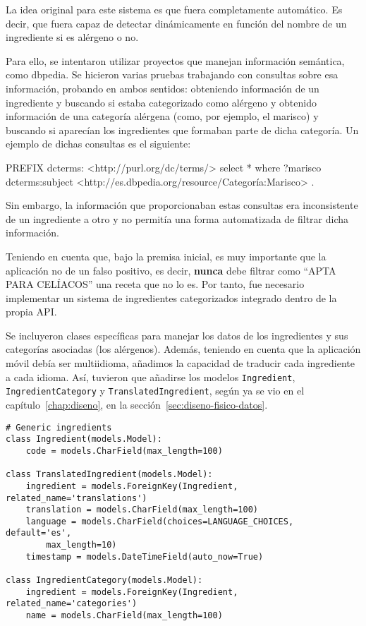 La idea original para este sistema es que fuera completamente automático. Es
decir, que fuera capaz de detectar dinámicamente en función del nombre de un
ingrediente si es alérgeno o no.

Para ello, se intentaron utilizar proyectos que manejan información semántica,
como dbpedia. Se hicieron varias pruebas trabajando con consultas sobre esa
información, probando en ambos sentidos: obteniendo información de un ingrediente
y buscando si estaba categorizado como alérgeno y  obtenido información de una
categoría alérgena (como, por ejemplo, el marisco) y buscando si aparecían
los ingredientes que formaban parte de dicha categoría. Un ejemplo de dichas
consultas es el siguiente:

\begin{bashcode}
PREFIX dcterms: <http://purl.org/dc/terms/>
select * where{
  ?marisco dcterms:subject <http://es.dbpedia.org/resource/Categoría:Marisco> .
}
\end{bashcode}

Sin embargo, la información que proporcionaban estas consultas era inconsistente
de un ingrediente a otro y no permitía una forma automatizada de filtrar dicha
información.

Teniendo en cuenta que, bajo la premisa inicial, es muy importante que la
aplicación no de un falso positivo, es decir, \textbf{nunca} debe filtrar como
``APTA PARA CELÍACOS'' una receta que no lo es. Por tanto, fue necesario
implementar un sistema de ingredientes categorizados integrado dentro de la
propia API.

Se incluyeron clases específicas para manejar los datos de los ingredientes y
sus categorías asociadas (los alérgenos). Además, teniendo en cuenta que la
aplicación móvil debía ser multiidioma, añadimos la capacidad de traducir cada
ingrediente a cada idioma. Así, tuvieron que añadirse los modelos
\texttt{Ingredient}, \texttt{IngredientCategory} y \texttt{TranslatedIngredient},
según ya se vio en el capítulo~\ref{chap:diseno}, en la
sección~\ref{sec:diseno-fisico-datos}.

\begin{verbatim}
# Generic ingredients
class Ingredient(models.Model):
    code = models.CharField(max_length=100)

class TranslatedIngredient(models.Model):
    ingredient = models.ForeignKey(Ingredient, related_name='translations')
    translation = models.CharField(max_length=100)
    language = models.CharField(choices=LANGUAGE_CHOICES, default='es',
        max_length=10)
    timestamp = models.DateTimeField(auto_now=True)

class IngredientCategory(models.Model):
    ingredient = models.ForeignKey(Ingredient, related_name='categories')
    name = models.CharField(max_length=100)
\end{verbatim}

